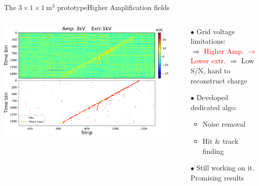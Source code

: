 \documentclass[10pt]{beamer}
\begin{document}
     \begin{frame}{The \texorpdfstring{$3 \times 1 \times \SI{1}{\meter\cubed}$}{311} prototype}{Higher Amplification fields}
     	\begin{scriptsize}
     		\begin{columns}
     			\begin{column}{0.75\textwidth}
     				\includegraphics[width=\textwidth]{figures/311/track.png}\\
     			\end{column}\hfill
     			\begin{column}{0.4\textwidth}
     				\begin{itemize}
     					\item[$\bullet$] Grid voltage limitations:\\
		     			$\Rightarrow$ \textcolor{red}{Higher Amp. $\rightarrow$ Lower extr.}
		     			$\Rightarrow$ Low S/N, hard to reconstruct charge
     					\item[$\bullet$] Developed dedicated algo:
     					\begin{itemize}
     						\item Noise removal
     						\item Hit \& track finding
     					\end{itemize}
     					\item[$\bullet$] Still working on it. Promising results
     				\end{itemize}
     			\end{column}
     		\end{columns}
	     \end{scriptsize}
     \end{frame}
    
\end{document}

